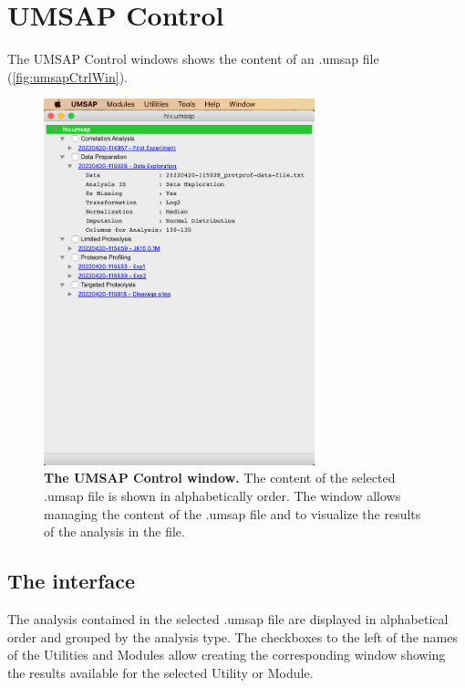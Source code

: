 \chapter{UMSAP Control}
\label{chap:umsapCtrl}

The UMSAP Control windows shows the content of an .umsap file (\autoref{fig:umsapCtrlWin}).

\begin{figure}[h]
    \centering
    \includegraphics[width=0.7\textwidth]{./IMAGES/UMSAPCtrl/UMSAPCtrl.jpg}
    \caption[The UMSAP Control window]{\textbf{The UMSAP Control window.} The content
    of the selected .umsap file is shown in alphabetically order. The window allows
    managing the content of the .umsap file and to visualize the results of the analysis
    in the file.} 
    \label{fig:umsapCtrlWin}
    \vspace{-5pt}
\end{figure}

\section{The interface}

The analysis contained in the selected .umsap file are displayed in alphabetical
order and grouped by the analysis type. The checkboxes to the left of the names of
the Utilities and Modules allow creating the corresponding window showing the results
available for the selected Utility or Module.

